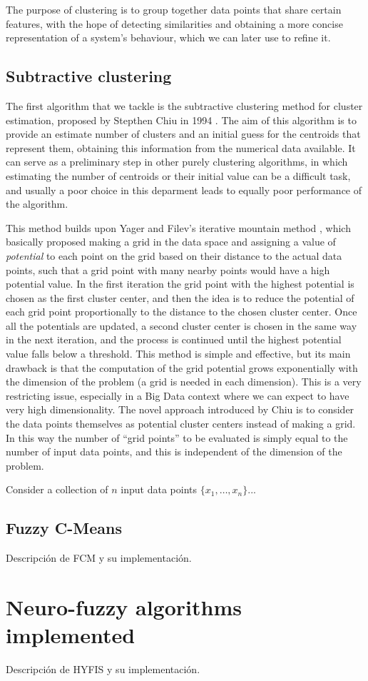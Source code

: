 The purpose of clustering is to group together data points that share certain features, with the hope of detecting similarities and obtaining a more concise representation of a system's behaviour, which we can later use to refine it.

\subsection{Subtractive clustering}

The first algorithm that we tackle is the subtractive clustering method for cluster estimation, proposed by Stepthen Chiu in 1994 \cite{chiu1994identification}. The aim of this algorithm is to provide an estimate number of clusters and an initial guess for the centroids that represent them, obtaining this information from the numerical data available. It can serve as a preliminary step in other purely clustering algorithms, in which estimating the number of centroids or their initial value can be a difficult task, and usually a poor choice in this deparment leads to equally poor performance of the algorithm.

This method builds upon Yager and Filev's iterative mountain method \cite{yager1994approximate}, which basically proposed making a grid in the data space and assigning a value of \textit{potential} to each point on the grid based on their distance to the actual data points, such that a grid point with many nearby points would have a high potential value. In the first iteration the grid point with the highest potential is chosen as the first cluster center, and then the idea is to reduce the potential of each grid point proportionally to the distance to the chosen cluster center. Once all the potentials are updated, a second cluster center is chosen in the same way in the next iteration, and the process is continued until the highest potential value falls below a threshold. This method is simple and effective, but its main drawback is that the computation of the grid potential grows exponentially with the dimension of the problem (a grid is needed in each dimension). This is a very restricting issue, especially in a Big Data context where we can expect to have very high dimensionality. The novel approach introduced by Chiu is to consider the data points themselves as potential cluster centers instead of making a grid. In this way the number of ``grid points'' to be evaluated is simply equal to the number of input data points, and this is independent of the dimension of the problem.

Consider a collection of $n$ input data points $\{x_1,\dots,x_n\}$...

\subsection{Fuzzy C-Means}
Descripción de FCM y su implementación.
\section{Neuro-fuzzy algorithms implemented}
Descripción de HYFIS y su implementación.
